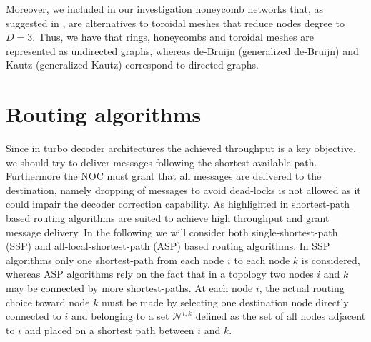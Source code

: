 \documentclass[10pt,twocolumn,journal]{IEEEtran}
\begin{document}
Moreover, we included in our investigation honeycomb networks that, 
as suggested in \cite{parhami_TPDS01}, are alternatives to toroidal meshes that reduce nodes degree to $D=3$.
Thus, we have that rings, honeycombs and toroidal meshes are represented as undirected graphs, whereas de-Bruijn (generalized de-Bruijn) and Kautz (generalized Kautz) correspond to 
directed graphs.

\section{Routing algorithms}
\label{sec:ra}

Since in turbo decoder architectures the achieved throughput is a key objective, we should try to deliver 
messages following the shortest available path. Furthermore the NOC must grant that all messages are delivered to 
the destination, namely dropping of messages to avoid dead-locks is not allowed as it could impair the decoder 
correction capability.
As highlighted in \cite{moussa_iscas08} shortest-path 
based routing algorithms are suited to achieve high throughput and grant message delivery. 
In the following we will consider both single-shortest-path (SSP) and all-local-shortest-path (ASP)
based routing algorithms.
In SSP algorithms only one shortest-path from each node $i$ to each node $k$ is considered, whereas ASP algorithms 
rely on the fact that in a topology two nodes $i$ and $k$ may be connected by more shortest-paths. 
At each node $i$, the actual routing choice toward node $k$ must be made by selecting one destination node 
directly connected to $i$ and belonging to a set $\mathcal{N}^{i,k}$ defined as the set of all nodes adjacent to 
$i$ and placed on a shortest path between $i$ and $k$.
\end{document}
